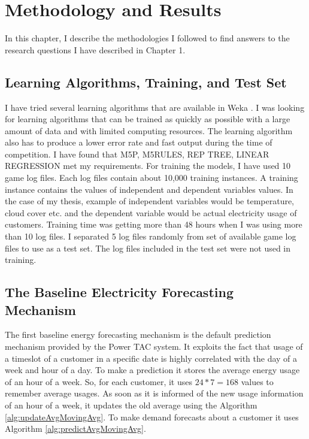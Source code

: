 
\chapter{Methodology and Results}

In this chapter, I describe the methodologies I followed to find answers to the research questions I have described in Chapter 1.


\section{Learning Algorithms, Training, and Test Set}
I have tried several learning algorithms that are available in Weka \cite{witten2005data}. I was looking for learning algorithms that can be trained as quickly as possible with a large amount of data and with limited computing resources. The learning algorithm also has to produce a lower error rate and fast output during the time of competition. I have found that M5P, M5RULES, REP TREE, LINEAR REGRESSION \cite{witten2005data} met my requirements. For training the models, I have used 10 game log files. Each log files contain about 10,000 training instances. A training instance contains the values of independent and dependent variables values. In the case of my thesis, example of independent variables would be temperature, cloud cover etc. and the dependent variable would be actual electricity usage of customers. Training time was getting more than 48 hours when I was using more than 10 log files. I separated 5  log files randomly from set of available game log files to use as a test set. The log files included in the test set were not used in training.

\section{The Baseline Electricity Forecasting Mechanism}
The first baseline energy forecasting mechanism is the default prediction mechanism provided by the Power TAC system. It exploits the fact that usage of a timeslot of a customer in a specific date is highly correlated with the day of a week and hour of a day. To make a prediction it stores the average energy usage of an hour of a week. So, for each customer, it uses $24*7 = 168$ values to remember average usages. As soon as it is informed of the new usage information of an hour of a week, it updates the old average using the Algorithm \ref{alg:updateAvgMovingAvg}. To make demand forecasts about a customer it uses Algorithm \ref{alg:predictAvgMovingAvg}.

